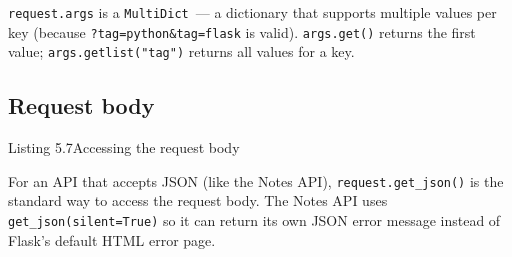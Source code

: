\noindent{}\texttt{request.args} is a \texttt{MultiDict}~--- a dictionary that supports multiple values per key (because \texttt{?}\allowbreak{}\texttt{tag=}\allowbreak{}\texttt{python\&}\allowbreak{}\texttt{tag=}\allowbreak{}\texttt{flask} is valid). \texttt{args.get()} returns the first value; \texttt{args.getlist("tag")} returns all values for a key.

\subsection*{Request body}\label{05-internal-request-execution:request-body}

\begin{codeboxcap}[short]{\textcolor{accent}{Listing 5.7}\enspace Accessing the request body}

\begin{Shaded}
\begin{Highlighting}[]
\OperatorTok{=}

\OperatorTok{=}

\OperatorTok{=}\OperatorTok{=}\NormalTok{)}

\OperatorTok{=}\NormalTok{)}

\OperatorTok{=}\NormalTok{)}
\end{Highlighting}
\end{Shaded}

\end{codeboxcap}

\noindent{}For an API that accepts JSON (like the Notes API), \texttt{request.get\_json()} is the standard way to access the request body. The Notes API uses \texttt{get\_json(silent=}\allowbreak{}\texttt{True)} so it can return its own JSON error message instead of Flask's default HTML error page.

